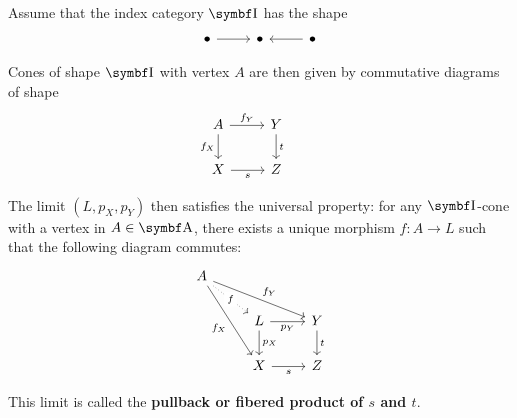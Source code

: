 \begin{definition}\label{def:categorical_pullback}\cite[definition 5.1.16]{Leinster2014}
  Assume that the index category \( \Bold I \) has the shape
  \begin{equation*}
    \begin{tikzcd}
      \bullet \arrow[r] & \bullet & \bullet \arrow[l]
    \end{tikzcd}
  \end{equation*}

  Cones of shape \( \Bold I \) with vertex \( A \) are then given by commutative diagrams of shape
  \begin{equation*}
    \begin{tikzcd}
      A \arrow[r, "f_Y"] \arrow[d, "f_X"'] & Y \arrow[d, "t"] & \\
      X \arrow[r, "s"'] & Z
    \end{tikzcd}
  \end{equation*}

  The limit \( (L, p_X, p_Y) \) then satisfies the universal property: for any \( \Bold I \)-cone with a vertex in \( A \in \Bold A \), there exists a unique morphism \( f: A \to L \) such that the following diagram commutes:
  \begin{equation*}
    \begin{tikzcd}
      A \arrow[rd, "f" description, dotted] \arrow[rrd, "f_Y"] \arrow[rdd, "f_X"'] &                                               &   \\
                                                                                   & L \arrow[r, "p_Y"'] \arrow[d, "p_X"] & Y \arrow[d, "t"] \\
                                                                                   & X \arrow[r, "s"']                             & Z
    \end{tikzcd}
  \end{equation*}

  This limit is called the \textbf{pullback or fibered product of \( s \) and \( t \)}.
\end{definition}

